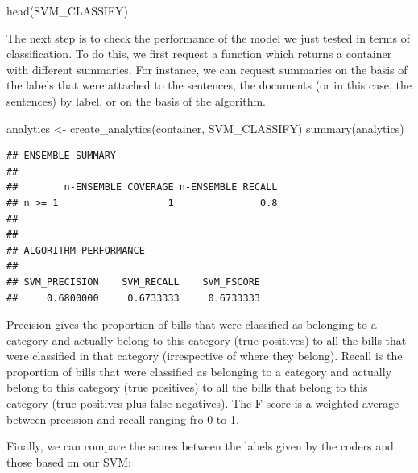 \documentclass[
]{book}
\newenvironment{Shaded}{\begin{snugshade}}{\end{snugshade}}
\newcommand{\DecValTok}[1]{\textcolor[rgb]{0.00,0.00,0.81}{#1}}
\newcommand{\FunctionTok}[1]{\textcolor[rgb]{0.00,0.00,0.00}{#1}}
\newcommand{\NormalTok}[1]{#1}
\newcommand{\OtherTok}[1]{\textcolor[rgb]{0.56,0.35,0.01}{#1}}
\newcommand{\SpecialCharTok}[1]{\textcolor[rgb]{0.00,0.00,0.00}{#1}}
\begin{document}
\begin{Shaded}
\begin{Highlighting}[]
\FunctionTok{head}\NormalTok{(SVM\_CLASSIFY)}
\end{Highlighting}
\end{Shaded}

The next step is to check the performance of the model we just tested in terms of classification. To do this, we first request a function which returns a container with different summaries. For instance, we can request summaries on the basis of the labels that were attached to the sentences, the documents (or in this case, the sentences) by label, or on the basis of the algorithm.

\begin{Shaded}
\begin{Highlighting}[]
\NormalTok{analytics }\OtherTok{\textless{}{-}} \FunctionTok{create\_analytics}\NormalTok{(container, SVM\_CLASSIFY)}
\FunctionTok{summary}\NormalTok{(analytics)}
\end{Highlighting}
\end{Shaded}

\begin{verbatim}
## ENSEMBLE SUMMARY
## 
##        n-ENSEMBLE COVERAGE n-ENSEMBLE RECALL
## n >= 1                   1               0.8
## 
## 
## ALGORITHM PERFORMANCE
## 
## SVM_PRECISION    SVM_RECALL    SVM_FSCORE 
##     0.6800000     0.6733333     0.6733333
\end{verbatim}

Precision gives the proportion of bills that were classified as belonging to a category and actually belong to this category (true positives) to all the bills that were classified in that category (irrespective of where they belong). Recall is the proportion of bills that were classified as belonging to a category and actually belong to this category (true positives) to all the bills that belong to this category (true positives plus false negatives). The F score is a weighted average between precision and recall ranging fro 0 to 1.

Finally, we can compare the scores between the labels given by the coders and those based on our SVM:

\begin{Shaded}
\end{Shaded}
\end{document}
